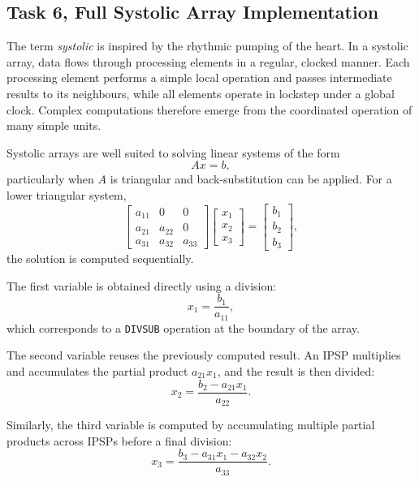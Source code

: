 \documentclass[a4paper,12pt]{article}
\begin{document}
\subsection{Task 6, Full Systolic Array Implementation}

The term \emph{systolic} is inspired by the rhythmic pumping of the heart. In a systolic array, data flows through processing elements in a regular, clocked manner. Each processing element performs a simple local operation and passes intermediate results to its neighbours, while all elements operate in lockstep under a global clock. Complex computations therefore emerge from the coordinated operation of many simple units.

Systolic arrays are well suited to solving linear systems of the form
\begin{equation}
A x = b,
\end{equation}
particularly when $A$ is triangular and back-substitution can be applied. For a lower triangular system,
\begin{equation}
\begin{bmatrix}
a_{11} & 0 & 0 \\
a_{21} & a_{22} & 0 \\
a_{31} & a_{32} & a_{33}
\end{bmatrix}
\begin{bmatrix}
x_1 \\ x_2 \\ x_3
\end{bmatrix}
=
\begin{bmatrix}
b_1 \\ b_2 \\ b_3
\end{bmatrix},
\end{equation}
the solution is computed sequentially.

The first variable is obtained directly using a division:
\begin{equation}
x_1 = \frac{b_1}{a_{11}},
\end{equation}
which corresponds to a \texttt{DIVSUB} operation at the boundary of the array.

The second variable reuses the previously computed result. An IPSP multiplies and accumulates the partial product $a_{21}x_1$, and the result is then divided:
\begin{equation}
x_2 = \frac{b_2 - a_{21}x_1}{a_{22}}.
\end{equation}

Similarly, the third variable is computed by accumulating multiple partial products across IPSPs before a final division:
\begin{equation}
x_3 = \frac{b_3 - a_{31}x_1 - a_{32}x_2}{a_{33}}.
\end{equation}
\end{document}
